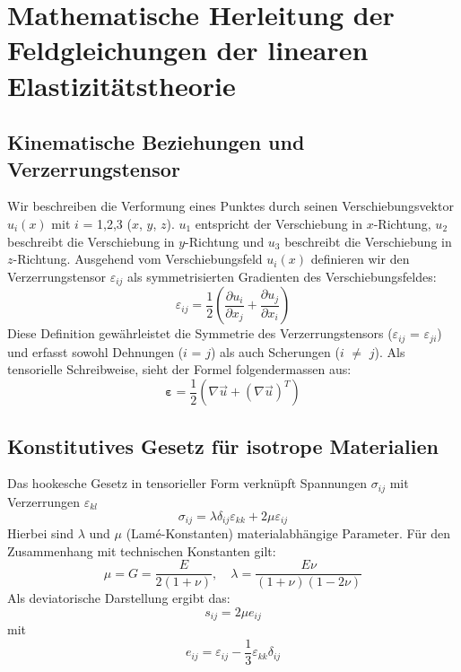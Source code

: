 %
%
%
%
\section{Mathematische Herleitung der Feldgleichungen der linearen Elastizitätstheorie}
\label{elastomechanik:section:herleitung2}

\subsection{Kinematische Beziehungen und Verzerrungstensor}
Wir beschreiben die Verformung eines Punktes durch seinen Verschiebungsvektor $u_i(x)$ mit $i$ = 1,2,3 ($x$, $y$, $z$).
$u_1$ entspricht der Verschiebung in $x$-Richtung, $u_2$ beschreibt die Verschiebung in $y$-Richtung und $u_3$ beschreibt die Verschiebung in $z$-Richtung.
Ausgehend vom Verschiebungsfeld $u_i(x)$ definieren wir den Verzerrungstensor $\varepsilon_{ij}$ als symmetrisierten Gradienten des Verschiebungsfeldes:
\begin{equation}
	\varepsilon_{ij} = 
	\frac{1}{2} \left( \frac{\partial u_i}{\partial x_j} + \frac{\partial u_j}{\partial x_i} \right)
\end{equation}
Diese Definition gewährleistet die Symmetrie des Verzerrungstensors ($\varepsilon_{ij}$ = $\varepsilon_{ji}$) und erfasst sowohl Dehnungen ($i$ = $j$) als auch Scherungen ($i$ $\neq$ $j$).
Als tensorielle Schreibweise, sieht der Formel folgendermassen aus:
\begin{equation}
	\boldsymbol{\varepsilon} = 
	\frac{1}{2} \left( \nabla \vec{u} + (\nabla \vec{u})^T \right)
\end{equation}

\subsection{Konstitutives Gesetz für isotrope Materialien}
Das hookesche Gesetz in tensorieller Form verknüpft Spannungen $\sigma_{ij}$ mit Verzerrungen $\varepsilon_{kl}$
\begin{equation}
	\sigma_{ij} = 
	\lambda \delta_{ij} \varepsilon_{kk} + 2\mu \varepsilon_{ij}
\end{equation}
Hierbei sind $\lambda$ und $\mu$ (Lamé-Konstanten) materialabhängige Parameter. Für den Zusammenhang mit technischen Konstanten gilt:
\begin{equation}
	\mu = 
	G = 
	\frac{E}{2(1+\nu)}, \quad \lambda = 
	\frac{E \nu}{(1+\nu)(1-2\nu)}
\end{equation}	
Als deviatorische Darstellung ergibt das:
\begin{equation}
	s_{ij} =
	2\mu e_{ij}
\end{equation}
mit
\begin{equation}
	e_{ij} = 
	\varepsilon_{ij} - \frac{1}{3} \varepsilon_{kk} \delta_{ij}
\end{equation}

